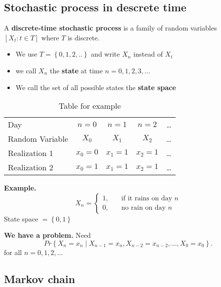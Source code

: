 \documentclass{article}
\theoremstyle{remark}
\begin{document}
\subsection{Stochastic process in descrete time}%
\label{sub:stochastic_process_in_descrete_time}
\begin{definition}
  A \textbf{discrete-time stochastic process}  is a family of random variables $\left[ X_{t} : t \in  T \right]$ where $T$ is discrete.
  \begin{itemize}
    \item We use $T = \left\{ 0,1,2,.. \right\}$ and write $X_{n}$ instead of $X_{t}$
    \item  we call $X_{n}$ the \textbf{state}  at time $n =  0,1,2,3, \ldots$
    \item We call the set of all possible states the \textbf{state space}
  \end{itemize}
\end{definition}

\begin{table}[htpb]
  \centering
  \caption{Table for example}
  \label{tab:label}
  \begin{tabular}{l|cccc}
    Day & $n =0$ & $n=1$ & $n=2$ & \ldots \\
    Random Variable  & $X_{0} $ & $X_{1}$ & $X_{2}$ & \ldots \\
    Realization  1& $x_{0} = 0$ & $x_{1} =1$ &  $x_{2} = 1 $ & \ldots \\
    Realization 2 & $x_{0} = 1$ & $x_{1} =1$ &  $x_{2} = 1 $ & \ldots \\
  \end{tabular}
\end{table}
\begin{tcolorbox}
  \textbf{Example.}  \[
  X_{n} = \begin{cases}
    1 ,  &  \quad \text{if it rains on day } n \\
    0,   &  \quad     \text{no rain on day } n
  \end{cases}
  \]
  State space $= \left\{ 0,1 \right\}$
  \par
  \textbf{We have a problem.} Need \[
  Pr \left \{ X_{n} = x_{n}  \mid  X_{n-1} = x_{n} , X_{n-2} = x_{n-2}, \ldots, X_{0} = x_{0} \right \}.
  \]    for all $n = 0,1,2,\ldots$

\end{tcolorbox}

\subsection{Markov chain}%
\label{sub:markov_chain}
\end{document}
